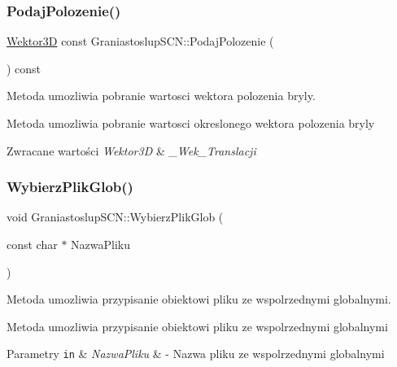 \subsubsection{\texorpdfstring{Podaj\+Polozenie()}{PodajPolozenie()}}
{\footnotesize\ttfamily \hyperlink{classSWektor}{Wektor3D} const Graniastoslup\+S\+C\+N\+::\+Podaj\+Polozenie (\begin{DoxyParamCaption}{ }\end{DoxyParamCaption}) const\hspace{0.3cm}{\ttfamily [inline]}}



Metoda umozliwia pobranie wartosci wektora polozenia bryly. 

Metoda umozliwia pobranie wartosci okreslonego wektora polozenia bryly 
\begin{DoxyRetVals}{Zwracane wartości}
{\em Wektor3D} & {\itshape \+\_\+\+Wek\+\_\+\+Translacji} \\
\hline
\end{DoxyRetVals}
\mbox{\label{classGraniastoslupSCN_a6c761ec9040c78b88e8f927bbe1fefb2}} 
\subsubsection{\texorpdfstring{Wybierz\+Plik\+Glob()}{WybierzPlikGlob()}}
{\footnotesize\ttfamily void Graniastoslup\+S\+C\+N\+::\+Wybierz\+Plik\+Glob (\begin{DoxyParamCaption}\item[{const char $\ast$}]{Nazwa\+Pliku }\end{DoxyParamCaption})\hspace{0.3cm}{\ttfamily [inline]}}



Metoda umozliwia przypisanie obiektowi pliku ze wspolrzednymi globalnymi. 

Metoda umozliwia przypisanie obiektowi pliku ze wspolrzednymi globalnymi


\begin{DoxyParams}[1]{Parametry}
\mbox{\tt in}  & {\em Nazwa\+Pliku} & -\/ Nazwa pliku ze wspolrzednymi globalnymi \\
\hline
\end{DoxyParams}
\mbox{\label{classGraniastoslupSCN_a279b52ec2cb4c39f1025089695388a2a}} 
